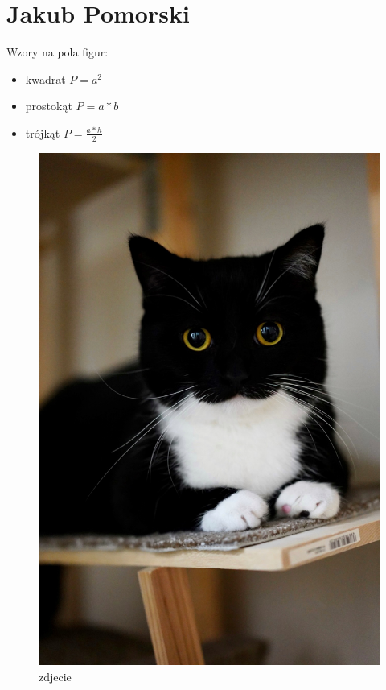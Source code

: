 \section{Jakub Pomorski}
\label{sec:mat}

Wzory na pola figur:
\begin{itemize}
    \item kwadrat $ P = a^2 $
    \item prostokąt $ P = a * b $
    \item trójkąt $ P = \frac{a * h}{2}\ $
\end{itemize}

\begin{figure}[htbp]
    \centering
    \includegraphics[scale=0.12]{pictures/image_Pomorski.jpg}
    \caption{zdjecie}
    \label{fig:zdj}
\end{figure}

